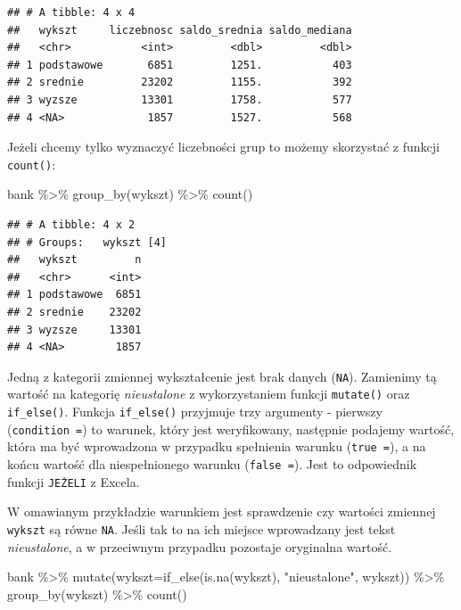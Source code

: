 \documentclass[
]{book}
\newenvironment{Shaded}{\begin{snugshade}}{\end{snugshade}}
\newcommand{\AttributeTok}[1]{\textcolor[rgb]{0.77,0.63,0.00}{#1}}
\newcommand{\FunctionTok}[1]{\textcolor[rgb]{0.00,0.00,0.00}{#1}}
\newcommand{\NormalTok}[1]{#1}
\newcommand{\SpecialCharTok}[1]{\textcolor[rgb]{0.00,0.00,0.00}{#1}}
\newcommand{\StringTok}[1]{\textcolor[rgb]{0.31,0.60,0.02}{#1}}
\begin{document}
\begin{verbatim}
## # A tibble: 4 x 4
##   wykszt     liczebnosc saldo_srednia saldo_mediana
##   <chr>           <int>         <dbl>         <dbl>
## 1 podstawowe       6851         1251.           403
## 2 srednie         23202         1155.           392
## 3 wyzsze          13301         1758.           577
## 4 <NA>             1857         1527.           568
\end{verbatim}

Jeżeli chcemy tylko wyznaczyć liczebności grup to możemy skorzystać z funkcji \texttt{count()}:

\begin{Shaded}
\begin{Highlighting}[]
\NormalTok{bank }\SpecialCharTok{\%\textgreater{}\%}
  \FunctionTok{group\_by}\NormalTok{(wykszt) }\SpecialCharTok{\%\textgreater{}\%}
  \FunctionTok{count}\NormalTok{()}
\end{Highlighting}
\end{Shaded}

\begin{verbatim}
## # A tibble: 4 x 2
## # Groups:   wykszt [4]
##   wykszt         n
##   <chr>      <int>
## 1 podstawowe  6851
## 2 srednie    23202
## 3 wyzsze     13301
## 4 <NA>        1857
\end{verbatim}

Jedną z kategorii zmiennej wykształcenie jest brak danych (\texttt{NA}). Zamienimy tą wartość na kategorię \emph{nieustalone} z wykorzystaniem funkcji \texttt{mutate()} oraz \texttt{if\_else()}. Funkcja \texttt{if\_else()} przyjmuje trzy argumenty - pierwszy (\texttt{condition\ =}) to warunek, który jest weryfikowany, następnie podajemy wartość, która ma być wprowadzona w przypadku spełnienia warunku (\texttt{true\ =}), a na końcu wartość dla niespełnionego warunku (\texttt{false\ =}). Jest to odpowiednik funkcji \texttt{JEŻELI} z Excela.

W omawianym przykładzie warunkiem jest sprawdzenie czy wartości zmiennej \texttt{wykszt} są równe \texttt{NA}. Jeśli tak to na ich miejsce wprowadzany jest tekst \emph{nieustalone}, a w przeciwnym przypadku pozostaje oryginalna wartość.

\begin{Shaded}
\begin{Highlighting}[]
\NormalTok{bank }\SpecialCharTok{\%\textgreater{}\%}
  \FunctionTok{mutate}\NormalTok{(}\AttributeTok{wykszt=}\FunctionTok{if\_else}\NormalTok{(}\FunctionTok{is.na}\NormalTok{(wykszt), }\StringTok{"nieustalone"}\NormalTok{, wykszt)) }\SpecialCharTok{\%\textgreater{}\%}
  \FunctionTok{group\_by}\NormalTok{(wykszt) }\SpecialCharTok{\%\textgreater{}\%}
  \FunctionTok{count}\NormalTok{()}
\end{Highlighting}
\end{Shaded}
\end{document}
